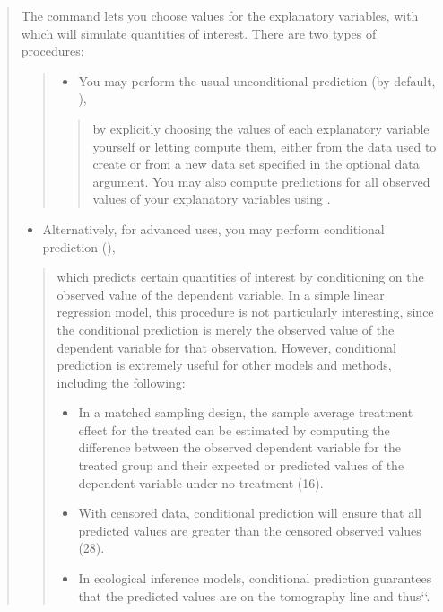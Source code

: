 \documentclass[letterpaper,10pt,english]{sphinxmanual}
\begin{document}
\begin{quote}

The  command lets you choose values for the explanatory variables, with which
 will simulate quantities of interest. There are two types of  procedures:
\begin{quote}
\begin{itemize}
\item {} 
You may perform the usual unconditional prediction (by default, ),

\end{itemize}
\begin{quote}

by explicitly choosing the values of each explanatory variable yourself or letting
 compute them, either from the data used to create  or from a new
data set specified in the optional data argument. You may also compute predictions
for all observed values of your explanatory variables using .
\end{quote}
\end{quote}
\begin{itemize}
\item {} 
Alternatively, for advanced uses, you may perform conditional prediction (),

\end{itemize}
\begin{quote}

which predicts certain quantities of interest by conditioning on the observed value of the dependent variable.
In a simple linear regression model, this
procedure is not particularly interesting, since the conditional prediction is merely
the observed value of the dependent variable for that observation. However, conditional prediction
is extremely useful for other models and methods, including
the following:
\begin{itemize}
\item {} 
In a matched sampling design, the sample average treatment effect for the
treated can be estimated by computing the difference between the observed
dependent variable for the treated group and their expected or predicted
values of the dependent variable under no treatment (16).

\item {} 
With censored data, conditional prediction will ensure that all predicted values
are greater than the censored observed values (28).

\item {} 
In ecological inference models, conditional prediction guarantees that the predicted values are on the tomography line and
thus{}`{}`.

\end{itemize}
\end{quote}
\end{quote}
\end{document}
